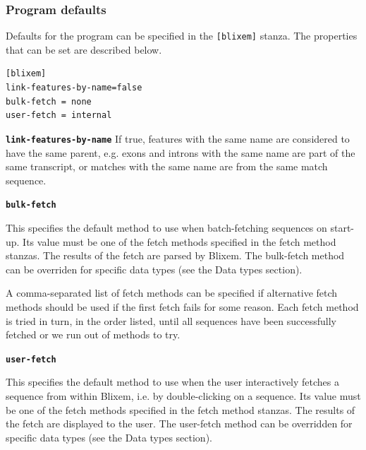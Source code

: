 \documentclass[letterpaper]{article}
\newcommand\textstyleSourceText[1]{\texttt{#1}}
\begin{document}
{\color[rgb]{0.30980393,0.5058824,0.7411765}\subsubsection[Program defaults]{Program defaults}}
\hypertarget{RefHeading37691724351149}{}{
Defaults for the program can be specified in the
\textstyleSourceText{\textrm{[blixem]}} stanza. The properties that can
be set are described below. }

\bigskip

\begin{verbatim}
[blixem]
link-features-by-name=false
bulk-fetch = none
user-fetch = internal
\end{verbatim}

{\textstyleSourceText{\textrm{\textbf{link-features-by-name}}}\textbf{ }}
{If true, features with the same name are considered to have the same
parent, e.g. exons and introns with the same name are part of the same
transcript, or matches with the same name are from the same match
sequence. }

\bigskip

{\textstyleSourceText{\textrm{\textbf{bulk-fetch}}}\textbf{ }}

{This specifies the default method to use when batch-fetching sequences
on start-up. Its value must be one of the fetch methods specified in
the fetch method stanzas. The results of the fetch are parsed by
Blixem. The bulk-fetch method can be overriden for specific data types
(see the Data types section). }

\bigskip

{A comma-separated list of fetch methods can be specified if alternative
fetch methods should be used if the first fetch fails for some reason.
Each fetch method is tried in turn, in the order listed, until all
sequences have been successfully fetched or we run out of methods to
try. }

\bigskip

{\textstyleSourceText{\textrm{\textbf{user-fetch}}}\textbf{ }}

{This specifies the default method to use when the user interactively
fetches a sequence from within Blixem, i.e. by double-clicking on a
sequence. Its value must be one of the fetch methods specified in the
fetch method stanzas. The results of the fetch are displayed to the
user. The user-fetch method can be overridden for specific data types
(see the Data types section). }

\bigskip
\end{document}
